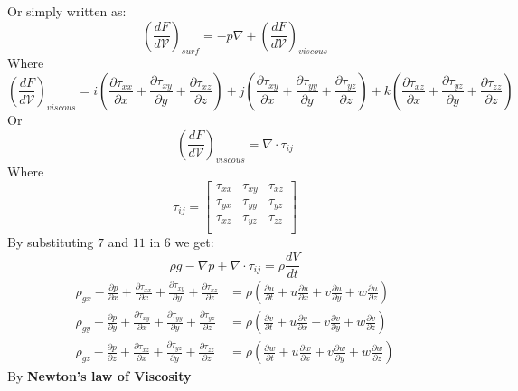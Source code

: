 \documentclass{article}
\begin{document}
Or simply written as:
\begin{equation}
\left(\frac{dF}{d\mathcal{V}}\right)_{surf} =-p\nabla+\left(\frac{dF}{d\mathcal{V}}\right)_{viscous}
\end{equation}
Where
$$\left(\frac{dF}{d\mathcal{V}}\right)_{viscous}=i\left(\frac{\partial{\tau_{xx}}}{\partial{x}}+\frac{\partial{\tau_{xy}}}{\partial{y}}+\frac{\partial{\tau_{xz}}}{\partial{z}} \right)+j\left(\frac{\partial{\tau_{xy}}}{\partial{x}}+\frac{\partial{\tau_{yy}}}{\partial{y}}+\frac{\partial{\tau_{yz}}}{\partial{z}} \right)+k\left(\frac{\partial{\tau_{xz}}}{\partial{x}}+\frac{\partial{\tau_{yz}}}{\partial{y}}+\frac{\partial{\tau_{zz}}}{\partial{z}} \right)$$
Or
$$\left(\frac{dF}{d\mathcal{V}}\right)_{viscous}=\nabla\cdot \tau_{ij}$$
Where
$$\tau_{ij}=\begin{bmatrix}
    \tau_{xx} & \tau_{xy} & \tau_{xz}\\
    \tau_{yx} & \tau_{yy} & \tau_{yz}\\
    \tau_{xz} & \tau_{yz} & \tau_{zz}\\
\end{bmatrix}$$
By substituting $7$ and $11$ in $6$ we get:
\begin{equation}
\rho g-\nabla p + \nabla \cdot \tau_{ij}=\rho \frac{dV}{dt} 
\end{equation}
\begin{equation}
\begin{aligned}
    \rho_{gx}-\frac{\partial{p}}{\partial{x}}
    +\frac{\partial{\tau_{xx}}}{\partial{x}}
    +\frac{\partial{\tau_{xy}}}{\partial{y}}
    +\frac{\partial{\tau_{xz}}}{\partial{z}} &=
    \rho\left(\frac{\partial{u}}{\partial{t}}+
    u\frac{\partial{u}}{\partial{x}}+
    v\frac{\partial{u}}{\partial{y}}+
    w\frac{\partial{u}}{\partial{z}}
    \right)\\
    \rho_{gy}-\frac{\partial{p}}{\partial{y}}
    +\frac{\partial{\tau_{xy}}}{\partial{x}}
    +\frac{\partial{\tau_{yy}}}{\partial{y}}
    +\frac{\partial{\tau_{yz}}}{\partial{z}} &=
    \rho\left(\frac{\partial{v}}{\partial{t}}+
    u\frac{\partial{v}}{\partial{x}}+
    v\frac{\partial{v}}{\partial{y}}+
    w\frac{\partial{v}}{\partial{z}}
    \right)\\
    \rho_{gz}-\frac{\partial{p}}{\partial{z}}
    +\frac{\partial{\tau_{xz}}}{\partial{x}}
    +\frac{\partial{\tau_{yz}}}{\partial{y}}
    +\frac{\partial{\tau_{zz}}}{\partial{z}} &=
    \rho\left(\frac{\partial{w}}{\partial{t}}+
    u\frac{\partial{w}}{\partial{x}}+
    v\frac{\partial{w}}{\partial{y}}+
    w\frac{\partial{w}}{\partial{z}}
    \right)
\end{aligned}
\end{equation}
By \textbf{Newton's law of Viscosity}
\end{document}

